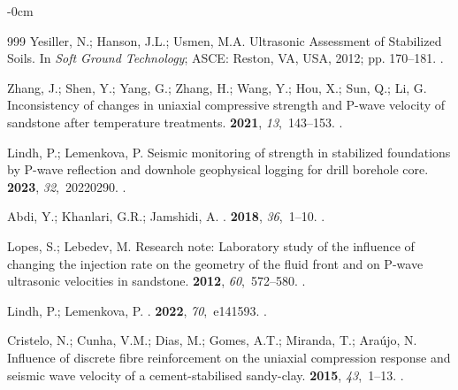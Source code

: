 \documentclass[sustainability,article,accept,pdftex,moreauthors]{Definitions/mdpi}
\begin{document}
{{\begin{adjustwidth}{-\extralength}{0cm}
\begin{thebibliography}{999}
Yesiller, N.; Hanson, J.L.; Usmen, M.A. Ultrasonic Assessment of Stabilized
  Soils.
\newblock In {\em Soft Ground Technology}; ASCE: Reston, VA, USA,  2012; pp. 170--181.
.

Zhang, J.; Shen, Y.; Yang, G.; Zhang, H.; Wang, Y.; Hou, X.; Sun, Q.; Li, G.
\newblock Inconsistency of changes in uniaxial compressive strength and P-wave
  velocity of sandstone after temperature treatments.
 {\bf
  2021}, {\em 13},~143--153.
.

Lindh, P.; Lemenkova, P.
\newblock Seismic monitoring of strength in stabilized foundations by P-wave
  reflection and downhole geophysical logging for drill borehole core.
 {\bf 2023},
  {\em 32},~20220290.
.

Abdi, Y.; Khanlari, G.R.; Jamshidi, A.
.
 {\bf 2018}, {\em 36},~1--10. %
.

Lopes, S.; Lebedev, M.
\newblock Research note: Laboratory study of the influence of changing the
  injection rate on the geometry of the fluid front and on P-wave ultrasonic
  velocities in sandstone.
 {\bf 2012}, {\em 60},~572--580.
.

Lindh, P.; Lemenkova, P.
.
  {\bf 2022}, {\em 70},~e141593.
.

Cristelo, N.; Cunha, V.M.; Dias, M.; Gomes, A.T.; Miranda, T.; Araújo, N.
\newblock Influence of discrete fibre reinforcement on the uniaxial compression
  response and seismic wave velocity of a cement-stabilised sandy-clay.
 {\bf 2015}, {\em 43},~1--13.
.


\end{thebibliography}
\end{adjustwidth}}}
\end{document}
